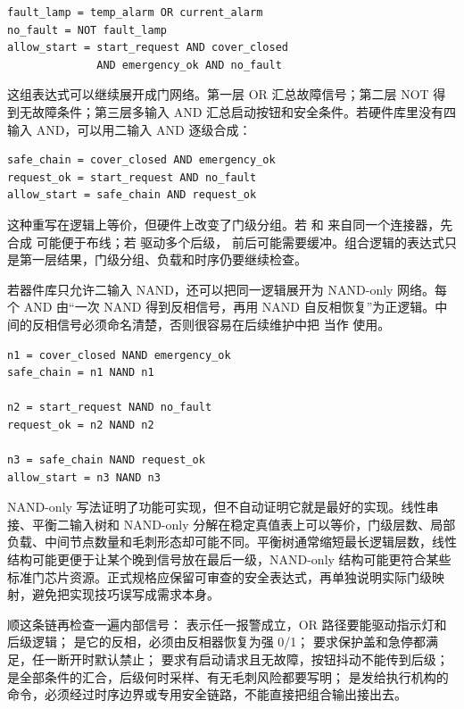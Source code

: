 \begin{lstlisting}
fault_lamp = temp_alarm OR current_alarm
no_fault = NOT fault_lamp
allow_start = start_request AND cover_closed
              AND emergency_ok AND no_fault
\end{lstlisting}

这组表达式可以继续展开成门网络。第一层 OR 汇总故障信号；第二层 NOT 得到无故障条件；第三层多输入 AND 汇总启动按钮和安全条件。若硬件库里没有四输入 AND，可以用二输入 AND 逐级合成：

\begin{lstlisting}
safe_chain = cover_closed AND emergency_ok
request_ok = start_request AND no_fault
allow_start = safe_chain AND request_ok
\end{lstlisting}

这种重写在逻辑上等价，但硬件上改变了门级分组。若  和  来自同一个连接器，先合成  可能便于布线；若  驱动多个后级， 前后可能需要缓冲。组合逻辑的表达式只是第一层结果，门级分组、负载和时序仍要继续检查。

若器件库只允许二输入 NAND，还可以把同一逻辑展开为 NAND-only 网络。每个 AND 由“一次 NAND 得到反相信号，再用 NAND 自反相恢复”为正逻辑。中间的反相信号必须命名清楚，否则很容易在后续维护中把  当作  使用。

\begin{lstlisting}
n1 = cover_closed NAND emergency_ok
safe_chain = n1 NAND n1

n2 = start_request NAND no_fault
request_ok = n2 NAND n2

n3 = safe_chain NAND request_ok
allow_start = n3 NAND n3
\end{lstlisting}

NAND-only 写法证明了功能可实现，但不自动证明它就是最好的实现。线性串接、平衡二输入树和 NAND-only 分解在稳定真值表上可以等价，门级层数、局部负载、中间节点数量和毛刺形态却可能不同。平衡树通常缩短最长逻辑层数，线性结构可能更便于让某个晚到信号放在最后一级，NAND-only 结构可能更符合某些标准门芯片资源。正式规格应保留可审查的安全表达式，再单独说明实际门级映射，避免把实现技巧误写成需求本身。

顺这条链再检查一遍内部信号： 表示任一报警成立，OR 路径要能驱动指示灯和后级逻辑； 是它的反相，必须由反相器恢复为强 0/1； 要求保护盖和急停都满足，任一断开时默认禁止； 要求有启动请求且无故障，按钮抖动不能传到后级； 是全部条件的汇合，后级何时采样、有无毛刺风险都要写明； 是发给执行机构的命令，必须经过时序边界或专用安全链路，不能直接把组合输出接出去。

